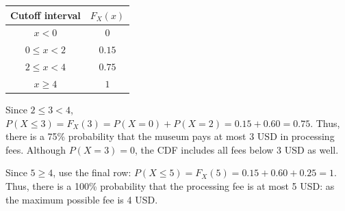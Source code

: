 \par%
\noindent%
\begin{minipage}[t]{.37\linewidth}%
  \vspace{0pt}\centering
  \begin{tabular}{cc}%
    \toprule
    Cutoff interval & $F_X(x)$ \\ \midrule
    $x<0$ & $0$ \\
    $0\leq x<2$ & $0.15$ \\
    $2\leq x<4$ & $0.75$ \\
    $x\geq 4$ & $1$ \\
    \bottomrule%
  \end{tabular}
\end{minipage}%
\hfill%
\begin{minipage}[t]{.60\linewidth}%
  \vspace{0pt}\centering
\end{minipage}%
\par


 Since $2\leq3<4$,
$P(X\leq3)=F_X(3)=P(X=0)+P(X=2)=0.15+0.60=0.75$.
Thus, there is a 75\% probability that the museum pays at most 3 USD in processing fees. Although $P(X=3)=0$, the CDF
includes all fees below 3 USD as well.

 Since $5\geq4$, use the final row:
$P(X\leq5)=F_X(5)=0.15+0.60+0.25=1$.
Thus, there is a 100\% probability that the processing fee is at most 5 USD: as the maximum possible fee is 4 USD.
\endgroup



